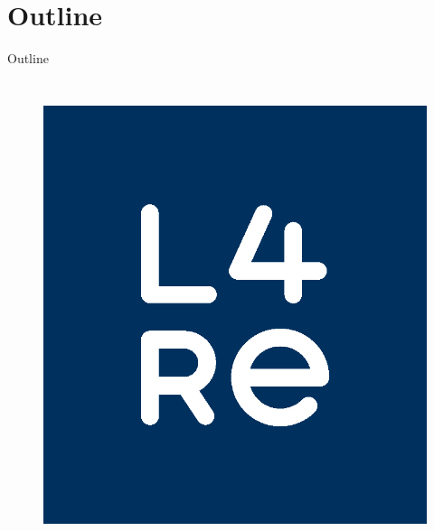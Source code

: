 \section*{Outline}
\label{sec:outline}

\begin{frame}{Outline}
  \vspace*{-1.0cm}
  \begin{columns}
      \tableofcontents[hideallsubsections]
      \begin{figure}
        \centering
        \includegraphics[keepaspectratio,scale=0.16]{figures/l4re-logo}
        \tiny\cite{l4re-logo}
      \end{figure}
  \end{columns}
\end{frame}
